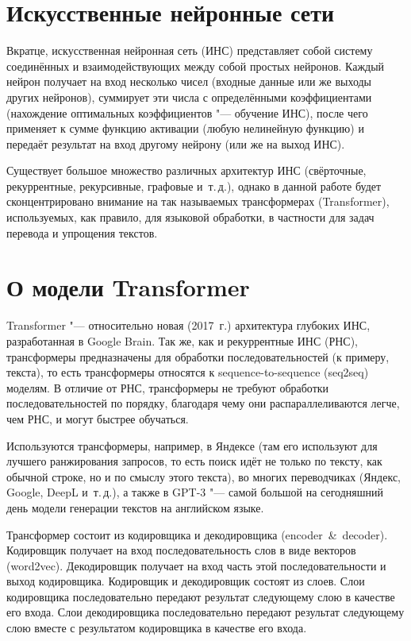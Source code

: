 \section{Искусственные нейронные сети}


Вкратце, искусственная нейронная сеть (ИНС) представляет собой систему соединённых и взаимодействующих между собой простых нейронов. Каждый нейрон получает на вход несколько чисел (входные данные или же выходы других нейронов), суммирует эти числа с определёнными коэффициентами (нахождение оптимальных коэффициентов "--- обучение ИНС), после чего применяет к сумме функцию активации (любую нелинейную функцию) и передаёт результат на вход другому нейрону (или же на выход ИНС).

Существует большое множество различных архитектур ИНС (свёрточные, рекуррентные, рекурсивные, графовые и~т.\,д.), однако в данной работе будет сконцентрировано внимание на так называемых трансформерах (Transformer), используемых, как правило, для языковой обработки, в частности для задач перевода и упрощения текстов.


\section{О модели Transformer}


Transformer "--- относительно новая (2017~г.) архитектура глубоких ИНС, разработанная в Google Brain.
Так же, как и рекуррентные ИНС (РНС), трансформеры предназначены для обработки последовательностей (к примеру, текста), то есть трансформеры относятся к sequence-to-sequence (seq2seq) моделям. В отличие от РНС, трансформеры не требуют обработки последовательностей по порядку, благодаря чему они распараллеливаются легче, чем РНС, и могут быстрее обучаться.

Используются трансформеры, например, в Яндексе (там его используют для лучшего ранжирования запросов, то есть поиск идёт не только по тексту, как обычной строке, но и по смыслу этого текста), во многих переводчиках (Яндекс, Google, DeepL и~т.\,д.), а также в GPT-3 "--- самой большой на сегодняшний день модели генерации текстов на английском языке.

% 
% 
% 
Трансформер состоит из кодировщика и декодировщика (encoder~\&~decoder). Кодировщик получает на вход последовательность слов в виде векторов (word2vec). Декодировщик получает на вход часть этой последовательности и выход кодировщика. Кодировщик и декодировщик состоят из слоев. Слои кодировщика последовательно передают результат следующему слою в качестве его входа. Слои декодировщика последовательно передают результат следующему слою вместе с результатом кодировщика в качестве его входа.

